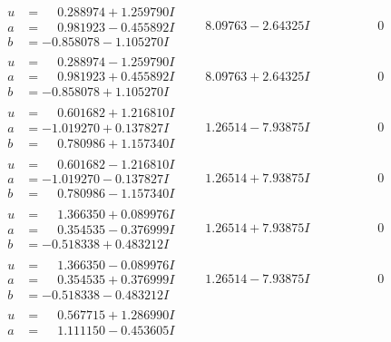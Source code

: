 \documentclass[1p]{elsarticle_modified}
\theoremstyle{definition}
\begin{document}
$$\begin{array}{c|c|c}
\begin{aligned}
u &= \phantom{-}0.288974 + 1.259790 I \\
a &= \phantom{-}0.981923 - 0.455892 I \\
b &= -0.858078 - 1.105270 I\end{aligned}
 & \phantom{-}8.09763 - 2.64325 I & \phantom{-0.000000 } 0 \\ \hline\begin{aligned}
u &= \phantom{-}0.288974 - 1.259790 I \\
a &= \phantom{-}0.981923 + 0.455892 I \\
b &= -0.858078 + 1.105270 I\end{aligned}
 & \phantom{-}8.09763 + 2.64325 I & \phantom{-0.000000 } 0 \\ \hline\begin{aligned}
u &= \phantom{-}0.601682 + 1.216810 I \\
a &= -1.019270 + 0.137827 I \\
b &= \phantom{-}0.780986 + 1.157340 I\end{aligned}
 & \phantom{-}1.26514 - 7.93875 I & \phantom{-0.000000 } 0 \\ \hline\begin{aligned}
u &= \phantom{-}0.601682 - 1.216810 I \\
a &= -1.019270 - 0.137827 I \\
b &= \phantom{-}0.780986 - 1.157340 I\end{aligned}
 & \phantom{-}1.26514 + 7.93875 I & \phantom{-0.000000 } 0 \\ \hline\begin{aligned}
u &= \phantom{-}1.366350 + 0.089976 I \\
a &= \phantom{-}0.354535 - 0.376999 I \\
b &= -0.518338 + 0.483212 I\end{aligned}
 & \phantom{-}1.26514 + 7.93875 I & \phantom{-0.000000 } 0 \\ \hline\begin{aligned}
u &= \phantom{-}1.366350 - 0.089976 I \\
a &= \phantom{-}0.354535 + 0.376999 I \\
b &= -0.518338 - 0.483212 I\end{aligned}
 & \phantom{-}1.26514 - 7.93875 I & \phantom{-0.000000 } 0 \\ \hline\begin{aligned}
u &= \phantom{-}0.567715 + 1.286990 I \\
a &= \phantom{-}1.111150 - 0.453605 I \\

\end{aligned}
\end{array}$$
\end{document}
